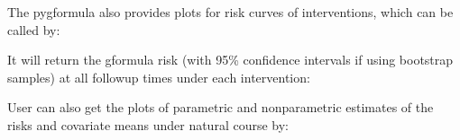 \documentclass[letterpaper,10pt,english]{sphinxmanual}
\begin{document}
\sphinxAtStartPar
The pygformula also provides plots for risk curves of interventions, which can be called by:
\begin{quote}

\begin{sphinxVerbatim}[commandchars=\\\{\}]
\end{sphinxVerbatim}
\end{quote}

\sphinxAtStartPar
It will return the g\sphinxhyphen{}formula risk (with 95\% confidence intervals if using bootstrap samples) at all follow\sphinxhyphen{}up times under each intervention:
\begin{quote}

\end{quote}

\sphinxAtStartPar
User can also get the plots of parametric and nonparametric estimates of
the risks and covariate means under natural course by:
\begin{quote}

\begin{sphinxVerbatim}[commandchars=\\\{\}]
\end{sphinxVerbatim}

\end{quote}
\end{document}
